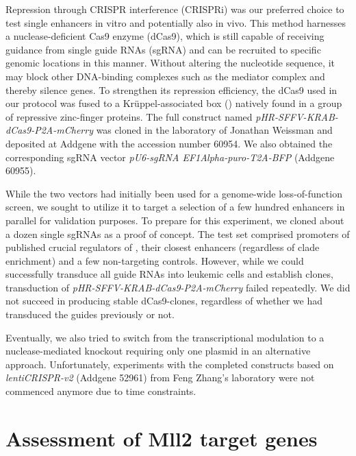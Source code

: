 Repression through CRISPR interference (CRISPRi) was our preferred choice to test single enhancers in vitro and potentially also in vivo. This method harnesses a nuclease-deficient Cas9 enzyme (dCas9), which is still capable of receiving guidance from single guide RNAs (sgRNA) and can be recruited to specific genomic locations in this manner. Without altering the nucleotide sequence, it may block other DNA-binding complexes such as the mediator complex\cite{Mittler2001} and thereby silence genes. To strengthen its repression efficiency, the dCas9 used in our protocol was fused to a Krüppel-associated box () natively found in a group of repressive zinc-finger proteins\cite{Witzgall1994,Urrutia2003}. The full construct named \emph{pHR-SFFV-KRAB-dCas9-P2A-mCherry} was cloned in the laboratory of Jonathan Weissman and deposited at Addgene with the accession number 60954\cite{Gilbert2014}. We also obtained the corresponding sgRNA vector \emph{pU6-sgRNA EF1Alpha-puro-T2A-BFP} (Addgene 60955).

While the two vectors had initially been used for a genome-wide loss-of-function screen\cite{Gilbert2014}, we sought to utilize it to target a selection of a few hundred enhancers in parallel for validation purposes. To prepare for this experiment, we cloned about a dozen single sgRNAs as a proof of concept. The test set comprised promoters of published crucial regulators of \mllafnine,  their closest enhancers (regardless of clade enrichment) and a few non-targeting controls. However, while we could successfully transduce all guide RNAs into \mllafnine leukemic cells and establish clones, transduction of \emph{pHR-SFFV-KRAB-dCas9-P2A-mCherry} failed repeatedly. We did not succeed in producing stable dCas9-clones, regardless of whether we had transduced the guides previously or not. 

Eventually, we also tried to switch from the transcriptional modulation to a nuclease-mediated knockout requiring only one plasmid in an alternative approach. Unfortunately, experiments with the completed constructs based on \emph{lentiCRISPR-v2} (Addgene 52961) from Feng Zhang's laboratory\cite{Sanjana2014} were not commenced anymore due to time constraints. 

\section{Assessment of Mll2 target genes}
\label{chap:r:enhancers:targets:mlltwotargets}

